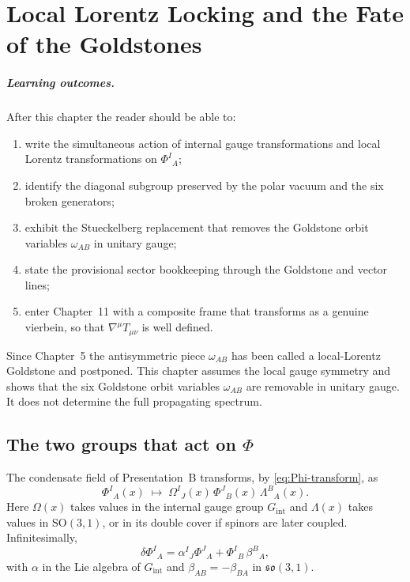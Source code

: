 \chapter[Lorentz locking]{Local Lorentz Locking and the Fate of the Goldstones}
\label{ch:lorentz-locking}

\paragraph{Learning outcomes.}
After this chapter the reader should be able to:
\begin{enumerate}
  \item write the simultaneous action of internal gauge
        transformations and local Lorentz transformations on
        \(\Phi^I{}_A\);
  \item identify the diagonal subgroup preserved by the polar vacuum
        and the six broken generators;
  \item exhibit the Stueckelberg replacement that removes the
        Goldstone orbit variables \(\omega_{AB}\) in unitary gauge;
  \item state the provisional sector bookkeeping through the
        Goldstone and vector lines;
  \item enter Chapter~11 with a composite frame that transforms as a
        genuine vierbein, so that \(\nabla^\mu T_{\mu\nu}\) is well
        defined.
\end{enumerate}

Since Chapter~5 the antisymmetric piece \(\omega_{AB}\) has been
called a local-Lorentz Goldstone and postponed. This chapter assumes the local gauge symmetry and shows that the six
Goldstone orbit variables \(\omega_{AB}\) are removable in unitary
gauge. It does not determine the full propagating spectrum.

\section{The two groups that act on \(\Phi\)}
\label{sec:ch10-groups}

The condensate field of Presentation~B transforms, by
\eqref{eq:Phi-transform}, as
\begin{equation}
  \label{eq:Phi-tr-again}
  \Phi^I{}_A(x)
  \;\longmapsto\;
  \Omega^I{}_J(x)\,\Phi^J{}_B(x)\,\Lambda^B{}_A(x).
\end{equation}
Here \(\Omega(x)\) takes values in the internal gauge group
\(G_{\mathrm{int}}\) and \(\Lambda(x)\) takes values in
\(\mathrm{SO}(3,1)\), or in its double cover if spinors are later
coupled. Infinitesimally,
\begin{equation}
  \label{eq:Phi-inf}
  \delta\Phi^I{}_A
  =\alpha^I{}_J\Phi^J{}_A
   +\Phi^I{}_B\,\beta^B{}_A,
\end{equation}
with \(\alpha\) in the Lie algebra of \(G_{\mathrm{int}}\) and
\(\beta_{AB}=-\beta_{BA}\) in \(\mathfrak{so}(3,1)\).

